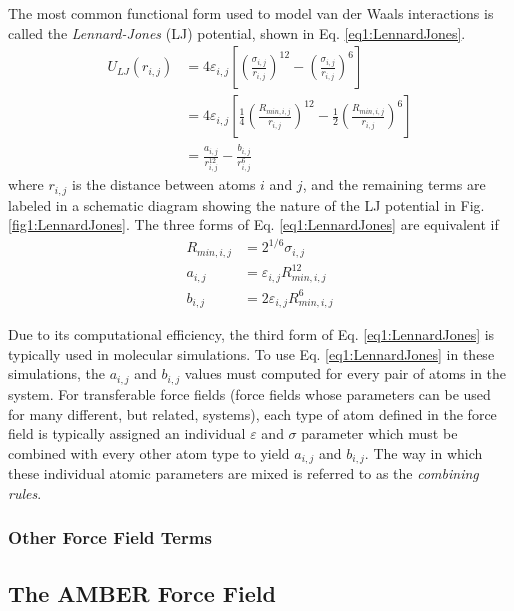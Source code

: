 The most common functional form used to model van der Waals interactions is
called the \emph{Lennard-Jones} (LJ) potential, shown in Eq.
\ref{eq1:LennardJones}.
\begin{align}
   U_{LJ} (r_{i,j}) & = 4 \varepsilon_{i,j} \left [ \left ( \frac {\sigma_{i,j}}
      {r_{i,j}} \right ) ^ {12} - \left ( \frac {\sigma_{i,j}} {r_{i,j}} 
      \right ) ^ 6 \right ] \nonumber \\
                    & = 4 \varepsilon_{i,j} \left [ \frac 1 4 \left ( \frac
      {R_{min,i,j}} {r_{i,j}} \right ) ^ {12} - \frac 1 2 \left (
      \frac{R_{min,i,j}} {r_{i,j}} \right ) ^ 6 \right ]
      \label{eq1:LennardJones} \\
                    & = \frac {a_{i,j}} {r_{i,j} ^ {12}} - \frac {b_{i,j}}
      {r_{i,j} ^ 6} \nonumber
\end{align}
where $r_{i,j}$ is the distance between atoms $i$ and $j$, and the remaining
terms are labeled in a schematic diagram showing the nature of the LJ potential
in Fig. \ref{fig1:LennardJones}. The three forms of Eq. \ref{eq1:LennardJones}
are equivalent if
\begin{eqnarray*}
   R_{min,i,j} & = 2 ^ {1/6} \sigma _ {i,j} \\
   a_{i,j} & = \varepsilon _ {i,j} R_{min,i,j} ^ {12} \\
   b_{i,j} & = 2 \varepsilon _ {i,j} R_{min,i,j} ^ 6
\end{eqnarray*}

Due to its computational efficiency, the third form of Eq.
\ref{eq1:LennardJones} is typically used in molecular simulations. To use Eq.
\ref{eq1:LennardJones} in these simulations, the $a_{i,j}$ and $b_{i,j}$ values
must computed for every pair of atoms in the system. For transferable force
fields (\ie force fields whose parameters can be used for many different, but
related, systems), each type of atom defined in the force field is typically
assigned an individual $\varepsilon$ and $\sigma$ parameter which must be
combined with every other atom type to yield $a_{i,j}$ and $b_{i,j}$. The way in
which these individual atomic parameters are mixed is referred to as the
\emph{combining rules}.

\subsubsection{Other Force Field Terms}

\subsection{The AMBER Force Field}
